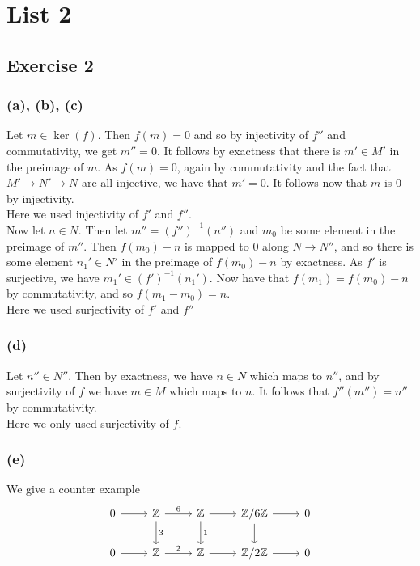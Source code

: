 \documentclass{article}
\theoremstyle{definition}
\newcommand{\Z}{\mathbb{Z}}
\begin{document}
\section*{List 2}

\subsection*{Exercise 2}

\subsubsection*{(a), (b), (c)}

Let $m \in \ker(f)$. Then $f(m) = 0$ and so by injectivity of $f''$ and
commutativity, we get $m'' = 0$. It follows by exactness that there is $m' \in
M'$ in the preimage of $m$. As $f(m) = 0$, again by commutativity and the fact
that $M' \to N' \to N$ are all injective, we have that $m' = 0$. It follows now
that $m$ is $0$ by injectivity. \\

Here we used injectivity of $f'$ and $f''$. \\

Now let $n \in N$. Then let $m'' = (f'')^{-1}(n'')$ and $m_0$ be some element
in the preimage of $m''$. Then $f(m_0) - n$ is mapped to $0$ along $N \to N''$,
and so there is some element $n_1' \in N'$ in the preimage of $f(m_0) - n$
by exactness. As $f'$ is surjective, we have $m_1' \in (f')^{-1}(n_1')$. 
Now have that $f(m_1) = f(m_0) - n$ by commutativity, and so $f(m_1 - m_0) = n$. \\

Here we used surjectivity of $f'$ and $f''$

\subsubsection*{(d)}

Let $n'' \in N''$. Then by exactness, we have $n \in N$ which maps to $n''$,
and by surjectivity of $f$ we have $m \in M$ which maps to $n$. It follows that 
$f''(m'') = n''$ by commutativity. \\

Here we only used surjectivity of $f$.

\subsubsection*{(e)}

We give a counter example
\[
\begin{tikzcd}
    0 
	\arrow{r} 
	& 
	\mathbb{\Z} 
	\arrow{r}{6}
	\arrow{d}{3} 
	& 
	\Z
	\arrow{r}
	\arrow{d}{1} 
	& 
	\Z/6\Z
	\arrow{r}
	\arrow{d} 
	& 
	0 \\
    0
	\arrow{r} 
	& 
	\Z
	\arrow{r}{2} 
	& 
	\Z
	\arrow{r}
	& 
	\Z/2\Z
	\arrow{r} 
	& 
	0
\end{tikzcd}
\] 
\end{document}
